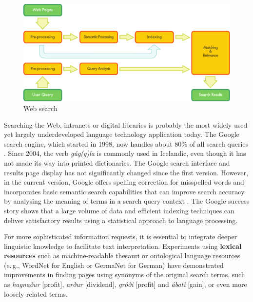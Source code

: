 \begin{multicols}{2}
\begin{figure}[t]
  \center
  \includegraphics[width=\textwidth]{../_media/english/web_search_architecture}
  \caption{Web search}
\label{fig:websearcharch_en}
 \end{figure}

Searching the Web, intranets or digital libraries is probably the most widely used yet largely underdeveloped language technology application today. The Google search engine, which started in 1998, now handles about 80\% of all search queries \cite{spi1}. Since 2004, the verb \textit{gúg(g)la} is commonly used in Icelandic, even though it has not made its way into printed dictionaries.  The Google search interface and results page display has not significantly changed since the first version. However, in the current version, Google offers spelling correction for misspelled words and incorporates basic semantic search capabilities that can improve search accuracy by analysing the meaning of terms in a search query context \cite{pc1}. The Google success story shows that a large volume of data and efficient indexing techniques can deliver satisfactory results using a statistical approach to language processing.

For more sophisticated information requests, it is essential to integrate deeper linguistic knowledge to facilitate text interpretation. Experiments using \textbf{lexical resources} such as machine-readable thesauri or ontological language resources (e.\,g., WordNet for English or GermaNet for German) have demonstrated improvements in finding pages using synonyms of the original search terms, such as \textit{hagnaður} {[}profit{]}, \textit{arður} {[}dividend{]}, \textit{gróði} {[}profit{]} and \textit{ábati} {[}gain{]}, or even more loosely related terms.



\end{multicols}
